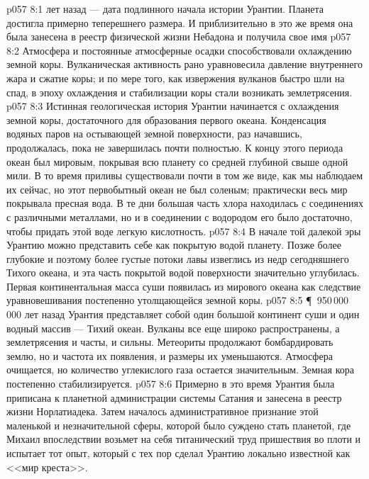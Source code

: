 \vs p057 8:1  лет назад --- дата подлинного начала истории Урантии. Планета достигла примерно теперешнего размера. И приблизительно в это же время она была занесена в реестр физической жизни Небадона и получила свое имя 
\vs p057 8:2 Атмосфера и постоянные атмосферные осадки способствовали охлаждению земной коры. Вулканическая активность рано уравновесила давление внутреннего жара и сжатие коры; и по мере того, как извержения вулканов быстро шли на спад, в эпоху охлаждения и стабилизации коры стали возникать землетрясения.
\vs p057 8:3 Истинная геологическая история Урантии начинается с охлаждения земной коры, достаточного для образования первого океана. Конденсация водяных паров на остывающей земной поверхности, раз начавшись, продолжалась, пока не завершилась почти полностью. К концу этого периода океан был мировым, покрывая всю планету со средней глубиной свыше одной мили. В то время приливы существовали почти в том же виде, как мы наблюдаем их сейчас, но этот первобытный океан не был соленым; практически весь мир покрывала пресная вода. В те дни большая часть хлора находилась с соединениях с различными металлами, но и в соединении с водородом его было достаточно, чтобы придать этой воде легкую кислотность.
\vs p057 8:4 В начале той далекой эры Урантию можно представить себе как покрытую водой планету. Позже более глубокие и поэтому более густые потоки лавы извеглись из недр сегодняшнего Тихого океана, и эта часть покрытой водой поверхности значительно углубилась. Первая континентальная масса суши появилась из мирового океана как следствие уравновешивания постепенно утолщающейся земной коры.
\vs p057 8:5 \P\ 950\,000\,000 лет назад Урантия представляет собой один большой континент суши и один водный массив --- Тихий океан. Вулканы все еще широко распространены, а землетрясения и часты, и сильны. Метеориты продолжают бомбардировать землю, но и частота их появления, и размеры их уменьшаются. Атмосфера очищается, но количество углекислого газа остается значительным. Земная кора постепенно стабилизируется.
\vs p057 8:6 Примерно в это время Урантия была приписана к планетной администрации системы Сатания и занесена в реестр жизни Норлатиадека. Затем началось административное признание этой маленькой и незначительной сферы, которой было суждено стать планетой, где Михаил впоследствии возьмет на себя титанический труд пришествия во плоти и испытает тот опыт, который с тех пор сделал Урантию локально известной как <<мир креста>>.
